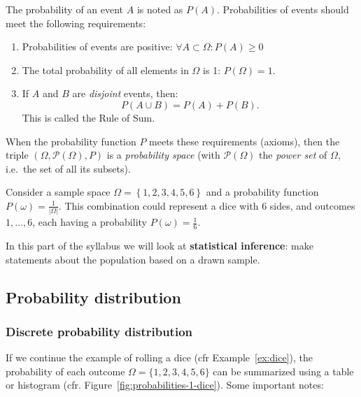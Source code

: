 \begin{definition} 
    The probability of an event $A$ is noted as $P(A)$. Probabilities of events should meet the following requirements:

   \begin{enumerate}
   \item Probabilities of events are positive: $\forall A \subset \Omega: P(A) \geq 0$
   \item The total probability of all elements in $\Omega$ is 1: $P(\Omega) = 1.$
   \item If $A$ and $B$ are \emph{disjoint} events, then:
    \[P(A\cup B) = P(A) + P(B). \]
    This is called the Rule of Sum.
   \end{enumerate}

   When the probability function $P$ meets these requirements (axioms), 
   then the triple $(\Omega, \mathcal{P}(\Omega), P)$ is a \emph{probability space} 
   (with $\mathcal{P}(\Omega)$ the \emph{power set} of $\Omega$, i.e.~the set of all its subsets).
\end{definition}
   
\begin{example}
\label{ex:dice}
    Consider a sample space $\Omega =  \left\{ 1,2,3,4,5,6 \right\} $ and a probability function $P(\omega) = \frac{1}{|\Omega|}$. 
    This combination could represent a dice with 6 sides, and outcomes $1, \ldots, 6$, each having a probability $P(\omega) = \frac{1}{6}$.
\end{example}
   
In this part of the syllabus we will look at \textbf{statistical inference}: make statements about the population based on a drawn sample.

\subsection{Probability distribution}
\label{ssec:probability-distribution}
   
\subsubsection{Discrete probability distribution}

If we continue the example of rolling a dice (cfr Example~\ref{ex:dice}), the probability of each outcome $\Omega = \{1,2,3,4,5,6\}$ can be summarized using a table or histogram (cfr. Figure~\ref{fig:probabilities-1-dice}). Some important notes:

